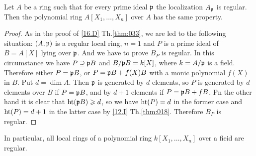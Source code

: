 \documentclass[../main]{subfiles}
\begin{document}
\begin{partheorem}\label{thm:040}
Let $A$ be a ring such that for every prime ideal $\mathfrak{p}$ the localization $A_{\mathfrak{p}}$ is regular. Then the polynomial ring $A[X_1, \ldots, X_n]$ over $A$ has the same property.
\end{partheorem} 
\begin{proof}
As in the proof of \ref{16.D} Th.\ref{thm:033}, we are led to the following situation: $(A, \mathfrak{p})$ is a regular local ring, $n=1$ and $P$ is a prime ideal of $B=A[X]$ lying over $\mathfrak{p}$. And we have to prove $B_P$ is regular. In this circumstance we have $P \supseteq \mathfrak{p} B$ and $B / \mathfrak{p} B=k[X]$, where $k=A / \mathfrak{p}$ is a field. Therefore either $P=\mathfrak{p} B$, or $P=\mathfrak{p} B+f(X) B$ with a monic polynomial $f(X)$ in $B$. Put $d = \dim A$. Then $\mathfrak{p}$ is generated by $d$ elements, so $P$ is generated by $d$ elements over $B$ if $P=\mathfrak{p} B$, and by $d+1$ elements if $P=\mathfrak{p}B+fB$. Pn the other hand it is clear that $\operatorname{ht}(\mathfrak{p}B)\geqslant d$, so we have $\operatorname{ht}(P)=d$ in the former case and $\operatorname{ht}(P)=d+1$ in the latter case by \ref{12.I} Th.\ref{thm:018}. Therefore $B_P$ is regular.
\end{proof}

In particular, all local rings of a polynomial ring $k[X_1, \ldots, X_n]$ over a fieid are regular.
\end{document}
